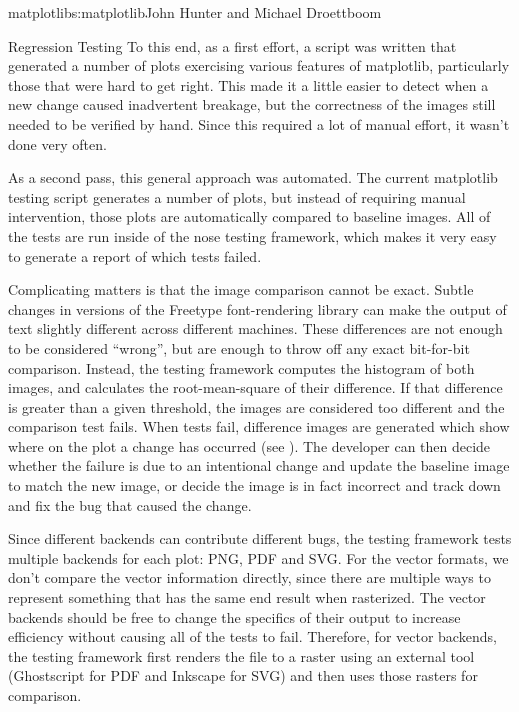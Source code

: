 \begin{aosachapter}{matplotlib}{s:matplotlib}{John Hunter and Michael Droettboom}
\begin{aosasect1}{Regression Testing}
To this end, as a first effort, a script was written that generated a
number of plots exercising various features of matplotlib,
particularly those that were hard to get right.  This made it a little
easier to detect when a new change caused inadvertent breakage, but
the correctness of the images still needed to be verified by hand.
Since this required a lot of manual effort, it wasn't done very often.

As a second pass, this general approach was automated.  The current
matplotlib testing script generates a number of plots, but instead of
requiring manual intervention, those plots are automatically compared
to baseline images.  All of the tests are run inside of the nose
testing framework, which makes it very easy to generate a report of
which tests failed.

Complicating matters is that the image comparison cannot be exact.
Subtle changes in versions of the Freetype font-rendering library can
make the output of text slightly different across different machines.
These differences are not enough to be considered ``wrong'', but are
enough to throw off any exact bit-for-bit comparison.  Instead, the
testing framework computes the histogram of both images, and
calculates the root-mean-square of their difference.  If that
difference is greater than a given threshold, the images are
considered too different and the comparison test fails.  When tests
fail, difference images are generated which show where on the plot a
change has occurred (see ).  The
developer can then decide whether the failure is due to an intentional
change and update the baseline image to match the new image, or
decide the image is in fact incorrect and track down and fix the bug
that caused the change.


Since different backends can contribute different bugs, the testing
framework tests multiple backends for each plot: PNG, PDF and SVG.
For the vector formats, we don't compare the vector information
directly, since there are multiple ways to represent something that
has the same end result when rasterized.  The vector backends should
be free to change the specifics of their output to increase efficiency
without causing all of the tests to fail.  Therefore, for vector
backends, the testing framework first renders the file to a raster
using an external tool (Ghostscript for PDF and Inkscape for SVG) and
then uses those rasters for comparison.


\end{aosasect1}
\end{aosachapter}
